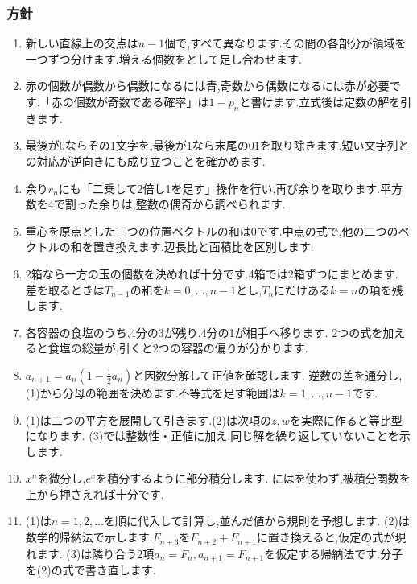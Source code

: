 \subsubsection{方針}\label{節：発展入門：方針}
\begin{enumerate}[label=\textbf{問\arabic*.},leftmargin=3.8em,format=\bookitemlink{practice-bridge}{hint}{answer}]
  \item 新しい直線上の交点は$n-1$個で,すべて異なります.その間の各部分が領域を一つずつ分けます.増える個数をとして足し合わせます.
  \item 赤の個数が偶数から偶数になるには青,奇数から偶数になるには赤が必要です.「赤の個数が奇数である確率」は$1-p_n$と書けます.立式後は定数の解を引きます.
  \item 最後が$0$ならその1文字を,最後が$1$なら末尾の$01$を取り除きます.短い文字列との対応が逆向きにも成り立つことを確かめます.
  \item 余り$r_n$にも「二乗して2倍し1を足す」操作を行い,再び余りを取ります.平方数を$4$で割った余りは,整数の偶奇から調べられます.
  \item 重心を原点とした三つの位置ベクトルの和は$0$です.中点の式で,他の二つのベクトルの和を置き換えます.辺長比と面積比を区別します.
  \item 2箱なら一方の玉の個数を決めれば十分です.4箱では2箱ずつにまとめます.
    差を取るときは$T_{n-1}$の和を$k=0,\ldots,n-1$とし,$T_n$にだけある$k=n$の項を残します.
  \item 各容器の食塩のうち,4分の3が残り,4分の1が相手へ移ります.
    2つの式を加えると食塩の総量が,引くと2つの容器の偏りが分かります.
  \item $a_{n+1}=a_n(1-\frac12a_n)$と因数分解して正値を確認します.
    逆数の差を通分し,(1)から分母の範囲を決めます.不等式を足す範囲は$k=1,\ldots,n-1$です.
  \item (1)は二つの平方を展開して引きます.(2)は次項の$z,w$を実際に作ると等比型になります.
    (3)では整数性・正値に加え,同じ解を繰り返していないことを示します.
  \item $x^n$を微分し,$e^x$を積分するように部分積分します.
    にはを使わず,被積分関数を上から押さえれば十分です.
  \item (1)は$n=1,2,\ldots$を順に代入して計算し,並んだ値から規則を予想します.
    (2)は数学的帰納法で示します.$F_{n+3}$を$F_{n+2}+F_{n+1}$に置き換えると,仮定の式が現れます.
    (3)は隣り合う2項$a_n=F_n,a_{n+1}=F_{n+1}$を仮定する帰納法です.分子を(2)の式で書き直します.
\end{enumerate}

